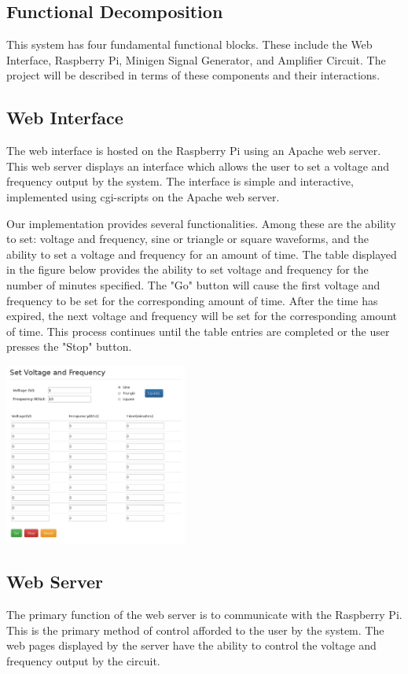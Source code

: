 \documentclass{article}	%
\begin{document}
\begin{multicols}{2}
\section{Functional Decomposition}
This system has four fundamental functional blocks.
These include the 
Web Interface, 
Raspberry Pi, 
Minigen Signal Generator, and
Amplifier Circuit.
The project will be described in terms of 
these components and
their interactions.

\subsection{Web Interface}
The web interface is hosted on the Raspberry Pi using an Apache web server.
This web server displays an interface which allows the user to
set a voltage and frequency output by the system. 
The interface is simple and interactive,
implemented using cgi-scripts on the Apache web server.

Our implementation provides several functionalities.
Among these are
the ability to set:
voltage and frequency,
sine or triangle or square waveforms,
and the ability to set a voltage and frequency for an amount of time.
The table displayed
in the figure below
provides the ability to set voltage and frequency for the number
of minutes specified.
The "Go" button will cause the first
voltage and frequency to be set for the corresponding amount of time.
After the time has expired,
the next voltage and frequency will be set for the corresponding amount of time.
This process continues until the table entries are completed or
the user presses the "Stop" button.

\begin{center}
\includegraphics[width=0.45\textwidth,keepaspectratio]{web_interface.pdf}
\end{center}

\subsection{Web Server}
The primary function of the web server is to communicate with the Raspberry Pi.
This is the primary method of control afforded 
to the user by the system. 
The web pages displayed by the server
have the ability to control the voltage and frequency output by the circuit.


\end{multicols}
\end{document}
